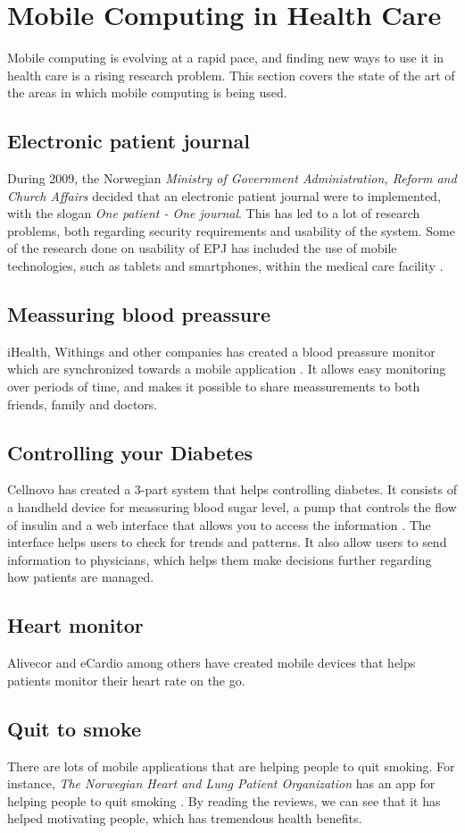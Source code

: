 \section{Mobile Computing in Health Care}
Mobile computing is evolving at a rapid pace, and finding new ways to use it in health care is a rising research problem. This section covers the state of the art of the areas in which mobile computing is being used.  

\subsection{Electronic patient journal}
During 2009, the Norwegian \emph{Ministry of Government Administration, Reform and Church Affairs} decided that an electronic patient journal were to implemented, with the slogan \emph{One patient - One journal}. This has led to a lot of research problems, both regarding security requirements and usability of the system. Some of the research done on usability of EPJ has included the use of mobile technologies, such as tablets and smartphones, within the medical care facility \cite{svanaes2010usability}.    

\subsection{Meassuring blood preassure}
iHealth, Withings and other companies has created a blood preassure monitor which are synchronized towards a mobile application \cite{ihealthlabs, withings}. It allows easy monitoring over periods of time, and makes it possible to share meassurements to both friends, family and doctors.


\subsection{Controlling your Diabetes}
Cellnovo has created a 3-part system that helps controlling diabetes. It consists of a handheld device for meassuring blood sugar level, a pump that controls the flow of insulin and a web interface that allows you to access the information \cite{cellnovo}. The interface helps users to check for trends and patterns. It also allow users to send information to physicians, which helps them make decisions further regarding how patients are managed.
   
\subsection{Heart monitor}
Alivecor and eCardio among others have created mobile devices that helps patients monitor their heart rate on the go\cite{eCardio, alivecor}. 

\subsection{Quit to smoke}
There are lots of mobile applications that are helping people to quit smoking. For instance, \emph{The Norwegian Heart and Lung Patient Organization} has an app for helping people to quit smoking \cite{roykeslutt}. By reading the reviews, we can see that it has helped motivating people, which has tremendous health benefits.   